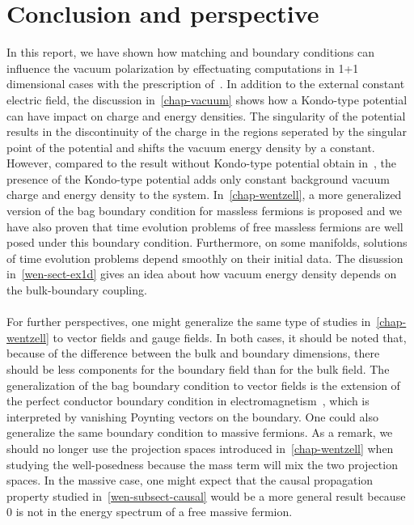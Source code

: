 \chapter{Conclusion and perspective}
In this report, we have shown how matching and boundary conditions can influence the vacuum polarization by effectuating computations in 1+1 dimensional cases with the prescription of~\cite{Zahn2015}. 
In addition to the external constant electric field,
the discussion in~\cref{chap-vacuum} shows how a Kondo-type potential can have impact on charge and energy densities.
The singularity of the potential results in the discontinuity of the charge in the regions seperated by the singular point of the potential and shifts the vacuum energy density by a constant.
However, compared to the result without Kondo-type potential obtain in~\cite{Zahn2015}, the presence of the Kondo-type potential adds only constant background vacuum charge and energy density to the system. 
In~\cref{chap-wentzell}, a more generalized version of the bag boundary condition for massless fermions is proposed and we have also proven that time evolution problems of free massless fermions are well posed under this boundary condition.
Furthermore, on some manifolds, solutions of time evolution problems depend smoothly on their initial data.
The disussion in~\cref{wen-sect-ex1d} gives an idea about how vacuum energy density depends on the bulk-boundary coupling.
\\\\
For further perspectives, 
one might generalize the same type of studies in~\cref{chap-wentzell} to vector fields and gauge fields.
In both cases, it should be noted that, because of the difference between the bulk and boundary dimensions, 
there should be less components for the boundary field than for the bulk field.
The generalization of the bag boundary condition to vector fields is the extension of the perfect conductor boundary condition in electromagnetism~\cite{Stokes2015}, 
which is interpreted by vanishing Poynting vectors on the boundary.
One could also generalize the same boundary condition to massive fermions. 
As a remark, 
we should no longer use the projection spaces introduced in~\cref{chap-wentzell} when studying the well-posedness because the mass term will mix the two projection spaces.
In the massive case, one might expect that the causal propagation property studied in~\cref{wen-subsect-causal} would be a more general result because 0 is not in the energy spectrum of a free massive fermion. 




